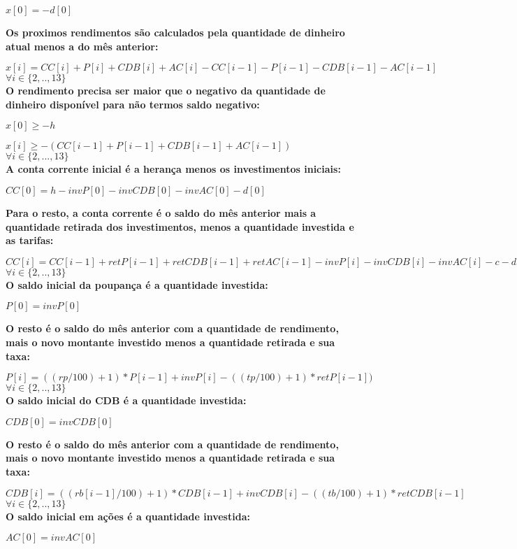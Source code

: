 \documentclass[12pt,a4paper]{article}
\begin{document}
$ x[0] = -d[0] $

\textbf{Os proximos rendimentos são calculados pela quantidade de dinheiro atual menos a do mês anterior:}

$ x[i] = CC[i] + P[i] + CDB[i] + AC[i] - CC[i-1] - P[i-1] - CDB[i-1] - AC[i-1]$ $\forall i \in \{2,..,13\} $ \\


\textbf{O rendimento precisa ser maior que o negativo da quantidade de dinheiro disponível para não termos saldo negativo:}

$ x[0] \geq -h $

$ x[i] \geq -(CC[i-1] + P[i-1] + CDB[i-1] + AC[i-1]) $ $\forall i \in \{2,...,13\}$\\


\textbf{A conta corrente inicial é a herança menos os investimentos iniciais:}

$ CC[0] = h - invP[0] - invCDB[0] - invAC[0] - d[0] $

\textbf{Para o resto, a conta corrente é o saldo do mês anterior mais a quantidade retirada dos investimentos, menos a quantidade investida e as tarifas:}

$ CC[i] = CC[i-1] + retP[i-1] + retCDB[i-1] + retAC[i-1] - invP[i] - invCDB[i] - invAC[i] - c - d[i]$ $\forall i \in \{2,..,13\}$\\


\textbf{O saldo inicial da poupança é a quantidade investida:}

$ P[0] = invP[0] $

\textbf{O resto é o saldo do mês anterior com a quantidade de rendimento, mais o novo montante investido menos a quantidade retirada e sua taxa:}

$ P[i] = ((rp/100)+1)*P[i-1] + invP[i] - ((tp/100)+1)*retP[i-1])$ $\forall i \in \{2,..,13\}$\\


\textbf{O saldo inicial do CDB é a quantidade investida:}

$ CDB[0] = invCDB[0] $

\textbf{O resto é o saldo do mês anterior com a quantidade de rendimento, mais o novo montante investido menos a quantidade retirada e sua taxa:}

$ CDB[i] = ((rb[i-1]/100)+1)*CDB[i-1] + invCDB[i] - ((tb/100)+1)*retCDB[i-1]$ $\forall i \in \{2,..,13\}$\\


\textbf{O saldo inicial em ações é a quantidade investida:}

$ AC[0] = invAC[0] $
\end{document}
